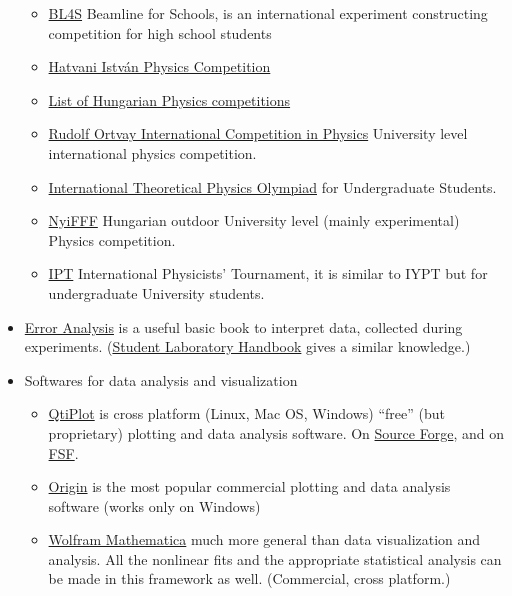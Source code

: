 \documentclass{article}
\begin{document}
\begin{itemize}
\begin{itemize}
\item \href{https://beamlineforschools.cern/home}{BL4S} Beamline for Schools, is an international experiment constructing competition for high school students

\item \href{http://hatvaniverseny.unideb.hu/}{Hatvani István Physics Competition}

\item \href{http://web.archive.org/web/20200318012748/http://fizika.fazekas.hu/index.php/2019/10/01/201920-as-tanev-versenyei-fizikabol/}{List of Hungarian Physics competitions}

\item \href{https://ortvay.elte.hu/main.html}{Rudolf Ortvay International Competition in Physics} University level international physics competition.

\item \href{http://thworldcup.com/about2020}{International Theoretical Physics Olympiad} for Undergraduate Students.

\item \href{http://nyifff.elte.hu/}{NyiFFF} Hungarian outdoor University level (mainly experimental)
Physics competition.

\item \href{https://iptnet.info/}{IPT} International Physicists' Tournament, it is similar to IYPT but for undergraduate University students.
\end{itemize}

\item \href{https://web.archive.org/web/20200318010340/http://hep.ucsb.edu/courses/ph128_18s/Taylor.pdf}{Error Analysis} is a useful basic book to interpret data, collected during experiments. (\href{https://web.archive.org/web/20190801072249/http://www2.phy.ilstu.edu/~wenning/slh/}{Student Laboratory Handbook} gives a similar knowledge.)

\item Softwares for data analysis and visualization
\begin{itemize}
    \item \href{https://www.qtiplot.com/index.html}{QtiPlot} is cross platform (Linux, Mac OS, Windows) ``free'' (but proprietary) plotting and data analysis software. On \href{https://sourceforge.net/projects/qtiplot.berlios/}{Source Forge}, and on \href{https://directory.fsf.org/wiki/Qtiplot}{FSF}.
    \item \href{https://www.originlab.com/}{Origin} is the most popular commercial plotting and data analysis software (works only on Windows)
    \item \href{https://www.wolfram.com/mathematica/}{Wolfram Mathematica} much more general than data visualization and analysis. All the nonlinear fits and the appropriate statistical analysis can be made in this framework as well. (Commercial, cross platform.)
\end{itemize}


\end{itemize}
\end{document}
